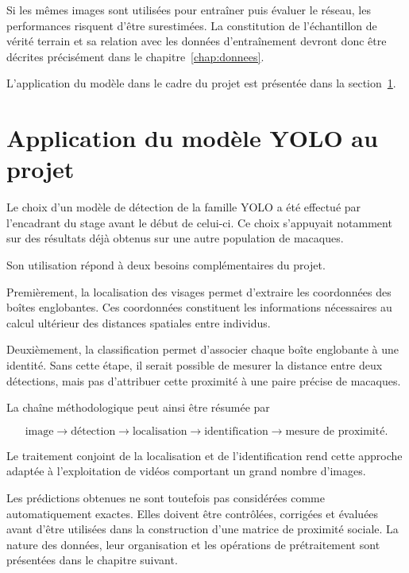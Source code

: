 \documentclass[11pt,a4paper]{report}
\begin{document}
Si les mêmes images sont utilisées pour entraîner puis évaluer le réseau, les
performances risquent d'être surestimées. La constitution de l'échantillon de
vérité terrain et sa relation avec les données d'entraînement devront donc être
décrites précisément dans le chapitre~\ref{chap:donnees}.

L'application du modèle dans le cadre du projet est présentée dans
 la section~\ref{sec:eval-application}.

\section{Application du modèle YOLO au projet}
\label{sec:eval-application}

Le choix d'un modèle de détection de la famille YOLO a été effectué par
l'encadrant du stage avant le début de celui-ci. Ce choix s'appuyait notamment
sur des résultats déjà obtenus sur une autre population de macaques.

Son utilisation répond à deux besoins complémentaires du projet.

Premièrement, la localisation des visages permet d'extraire les coordonnées des
boîtes englobantes. Ces coordonnées constituent les informations nécessaires
au calcul ultérieur des distances spatiales entre individus.

Deuxièmement, la classification permet d'associer chaque boîte englobante à une
identité. Sans cette étape, il serait possible de mesurer la distance entre
deux détections, mais pas d'attribuer cette proximité à une paire précise de
macaques.

La chaîne méthodologique peut ainsi être résumée par

\begin{equation}
    \text{image}
    \longrightarrow
    \text{détection}
    \longrightarrow
    \text{localisation}
    \longrightarrow
    \text{identification}
    \longrightarrow
    \text{mesure de proximité}.
\end{equation}

Le traitement conjoint de la localisation et de l'identification rend cette
approche adaptée à l'exploitation de vidéos comportant un grand nombre
d'images.

Les prédictions obtenues ne sont toutefois pas considérées comme
automatiquement exactes. Elles doivent être contrôlées, corrigées et évaluées
avant d'être utilisées dans la construction d'une matrice de proximité sociale.
La nature des données, leur organisation et les opérations de prétraitement
sont présentées dans le chapitre suivant.
\end{document}
